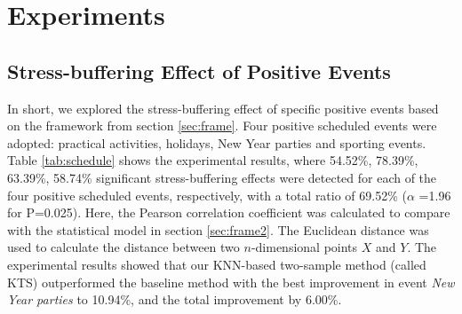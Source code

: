 \section{Experiments}
\subsection{Stress-buffering Effect of Positive Events}
\label{subsec:experiment}
In short,
we explored the stress-buffering effect of specific positive events based on the framework from section \ref{sec:frame}.
Four positive scheduled events were adopted:
practical activities, holidays, New Year parties and sporting events.
Table \ref{tab:schedule} shows the experimental results,
where 54.52\%, 78.39\%, 63.39\%, 58.74\% significant stress-buffering effects were detected for
each of the four positive scheduled events, respectively,
with a total ratio of 69.52\% ($\alpha$ =1.96 for P=0.025).
Here, the Pearson correlation coefficient was calculated to compare with the statistical model in section \ref{sec:frame2}.
The Euclidean distance was used to calculate the distance between two $n$-dimensional points $X$ and $Y$.
The experimental results showed that our KNN-based two-sample method (called KTS)
outperformed the baseline method with the best improvement in event \emph{New Year parties} to 10.94\%,
and the total improvement by 6.00\%.

\begin{table}
\begin{center}
\caption{\small{Quantification of the stress-buffering effect of positive scheduled events applying
the KTS model (the KNN-based two-sample method adopted in this research) and the baseline method.}}
\label{tab:schedule}
\end{center}
\end{table}

